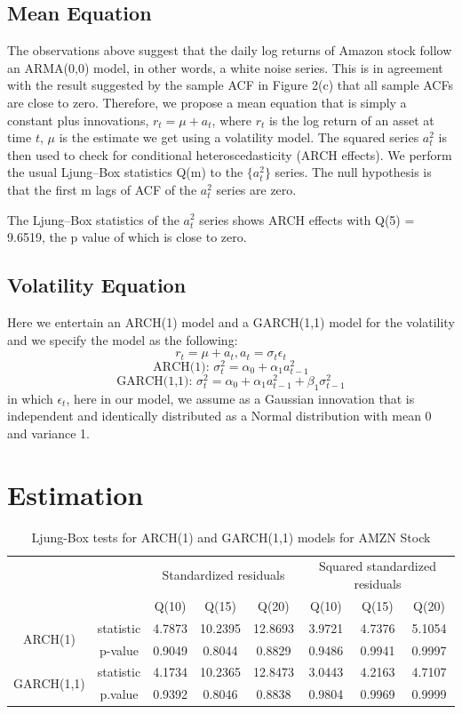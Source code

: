 \documentclass[paper=a4, fontsize=13pt]{article}
\begin{document}
\subsection{Mean Equation}
The observations above suggest that the daily log returns of Amazon stock follow an ARMA(0,0) model, in other words, a white noise series. This is in agreement with the result suggested by the sample ACF in Figure 2(c) that all sample ACFs are close to zero. Therefore, we propose a mean equation that is simply a constant plus innovations, $r_t = \mu + a_t$, where $r_t$  is the log return of an asset at time $t$, $\mu$ is the estimate we get using a volatility model. The squared series $a_t^2$ is then used to check for conditional heteroscedasticity (ARCH effects). We perform the usual Ljung–Box statistics Q(m) to the $\{a_t^2\}$ series. The null hypothesis is that the first m lags of ACF of the $a_t^2$ series are zero.

The Ljung–Box statistics of the $a_t^2$ series shows ARCH effects with Q(5) = 9.6519, the p value of which is close to zero.

\subsection{Volatility Equation}
Here we entertain an ARCH(1) model and a GARCH(1,1) model for the volatility and we specify the model as the following:
\[ r_t = \mu+a_t, a_t = \sigma_t \epsilon_t \]
\[ \text{ARCH(1): } \sigma_t^2 = \alpha_0+\alpha_1 a_{t-1}^2 \]
\[ \text{GARCH(1,1): } \sigma_t^2= \alpha_0+\alpha_1 a_{t-1}^2+\beta_1 \sigma_{t-1}^2 \]
in which $\epsilon_t$, here in our model, we assume as a Gaussian innovation that is independent and identically distributed as a Normal distribution with mean 0 and variance 1.

\section{Estimation}

\begin{table}[!htbp] \centering 
  \caption{Ljung-Box tests for ARCH(1) and GARCH(1,1) models for AMZN Stock} 
  \label{} 
\begin{tabular}{cc|cccccc} 
\\[-1.8ex]\hline 
\hline
& & \multicolumn{3}{c}{Standardized residuals} & \multicolumn{3}{c}{Squared standardized residuals} \\
& & Q(10) & Q(15) & Q(20) & Q(10) & Q(15) & Q(20) \\
\hline 
\multirow{2}{*}{ARCH(1)} & statistic & 4.7873 & 10.2395 & 12.8693 & 3.9721 & 4.7376 & 5.1054 \\
& p-value & 0.9049 & 0.8044 & 0.8829 & 0.9486 & 0.9941 & 0.9997 \\
\multirow{2}{*}{GARCH(1,1)} & statistic & 4.1734 & 10.2365 & 12.8473 & 3.0443 & 4.2163 & 4.7107 \\
& p.value & 0.9392 & 0.8046 & 0.8838 & 0.9804 & 0.9969 & 0.9999 \\
\hline
\hline 
\end{tabular} 
\end{table} 
\end{document}
